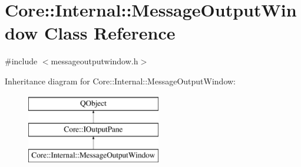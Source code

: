 \hypertarget{class_core_1_1_internal_1_1_message_output_window}{\section{Core\-:\-:Internal\-:\-:Message\-Output\-Window Class Reference}
\label{class_core_1_1_internal_1_1_message_output_window}
}


{\ttfamily \#include $<$messageoutputwindow.\-h$>$}

Inheritance diagram for Core\-:\-:Internal\-:\-:Message\-Output\-Window\-:\begin{figure}[H]
\begin{center}
\leavevmode
\includegraphics[height=3.000000cm]{class_core_1_1_internal_1_1_message_output_window}
\end{center}
\end{figure}
